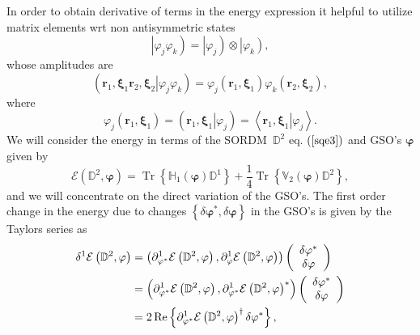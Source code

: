 \documentclass[aps,preprint]{revtex4}%
\begin{document}
In order to obtain derivative of terms in the energy expression it helpful to
utilize matrix elements wrt non antisymmetric states
\begin{equation}
\left\vert \varphi_{j}\varphi_{k}\right)  =\left\vert \varphi_{j}\right)
\otimes\left\vert \varphi_{k}\right)  ,
\end{equation}
whose amplitudes are
\begin{equation}
\left(  \left.  \mathbf{r}_{1}\mathbf{,\xi}_{1}\mathbf{r}_{2}\mathbf{,\xi}%
_{2}\right\vert \varphi_{j}\varphi_{k}\right)  =\varphi_{j}\left(
\mathbf{r}_{1}\mathbf{,\xi}_{1}\right)  \varphi_{k}\left(  \mathbf{r}%
_{2}\mathbf{,\xi}_{2}\right)  ,
\end{equation}
where
\begin{equation}
\varphi_{j}\left(  \mathbf{r}_{1}\mathbf{,\xi}_{1}\right)  =\left(  \left.
\mathbf{r}_{1}\mathbf{,\xi}_{1}\right\vert \varphi_{j}\right)  =\left\langle
\left.  \mathbf{r}_{1}\mathbf{,\xi}_{1}\right\vert \varphi_{j}\right\rangle .
\end{equation}
We will consider the energy in terms of the SORDM\ $\mathbb{D}^{2}$ eq.
$\left(  \ref{sqe3}\right)  $ and GSO's $\mathbf{\varphi}$ given by
\begin{equation}
\mathcal{E}\left(  \mathbb{D}^{2},\mathbf{\varphi}\right)  =\operatorname{Tr}%
\left\{  \mathbb{H}_{1}\left(  \mathbf{\varphi}\right)  \mathbb{D}%
^{1}\right\}  +\frac{1}{4}\operatorname{Tr}\left\{  \mathbb{V}_{2}\left(
\mathbf{\varphi}\right)  \mathbb{D}^{2}\right\}  , \label{e1}%
\end{equation}
and we will concentrate on the direct variation of the GSO's. The first order
change in the energy due to changes $\left\{  \delta\mathbf{\varphi}^{\ast
},\delta\mathbf{\varphi}\right\}  $ in the GSO's is given by the Taylors
series as
\begin{align}
\delta^{1}\mathcal{E}\left(  \mathbb{D}^{2},\mathbf{\varphi}\right)   &
=\left(  \partial_{\mathbf{\varphi}^{\ast}}^{1}\mathcal{E}\left(
\mathbb{D}^{2},\mathbf{\varphi}\right)  ,\partial_{\mathbf{\varphi}}%
^{1}\mathcal{E}\left(  \mathbb{D}^{2},\mathbf{\varphi}\right)  \right)
\left(
\begin{array}
[c]{c}%
\delta\mathbf{\varphi}^{\ast}\\
\delta\mathbf{\varphi}%
\end{array}
\right) \nonumber\\
&  =\left(  \partial_{\mathbf{\varphi}^{\ast}}^{1}\mathcal{E}\left(
\mathbb{D}^{2},\mathbf{\varphi}\right)  ,\partial_{\mathbf{\varphi}^{\ast}%
}^{1}\mathcal{E}\left(  \mathbb{D}^{2},\mathbf{\varphi}\right)  ^{\ast
}\right)  \left(
\begin{array}
[c]{c}%
\delta\mathbf{\varphi}^{\ast}\\
\delta\mathbf{\varphi}%
\end{array}
\right) \nonumber\\
&  =2\operatorname{Re}\left\{  \partial_{\mathbf{\varphi}^{\ast}}%
^{1}\mathcal{E}\left(  \mathbb{D}^{2},\mathbf{\varphi}\right)  ^{\dagger
}\delta\mathbf{\varphi}^{\ast}\right\}  ,
\end{align}
\end{document}
